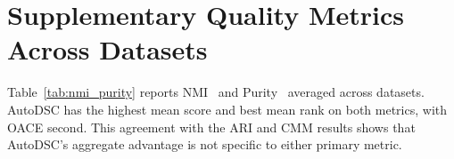 \documentclass[conference]{IEEEtran}
\begin{document}
\section{Supplementary Quality Metrics Across Datasets}\label{app:nmi_purity}

Table~\ref{tab:nmi_purity} reports NMI~\cite{strehl2002cluster} and Purity~\cite{steinbach2000comparison} averaged across datasets. AutoDSC has the highest mean score and best mean rank on both metrics, with OACE second. This agreement with the ARI and CMM results shows that AutoDSC's aggregate advantage is not specific to either primary metric.

\begin{table}[!ht]
\centering
\caption{Supplementary quality metrics across datasets. \textmd{Mean NMI and Purity ($\uparrow$ higher is better); best in \textbf{bold}, second best \underline{underlined}.}}
\label{tab:nmi_purity}
\end{table}



\end{document}
